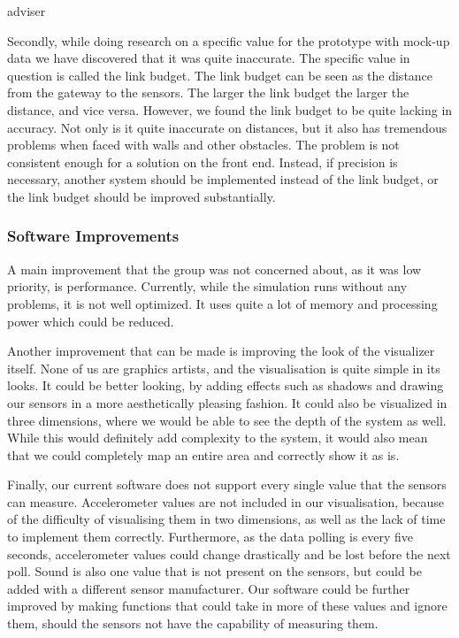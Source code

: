 adviser\documentclass[../document]{subfiles}
\begin{document}
Secondly, while doing research on a specific value for the prototype with mock-up data we have discovered that it was quite inaccurate. The specific value in question is called the link budget. The link budget can be seen as the distance from the gateway to the sensors. The larger the link budget the larger the distance, and vice versa. However, we found the link budget to be quite lacking in accuracy. Not only is it quite inaccurate on distances, but it also has tremendous problems when faced with walls and other obstacles. The problem is not consistent enough for a solution on the front end. Instead, if precision is necessary, another system should be implemented instead of the link budget, or the link budget should be improved substantially. 

\subsubsection{Software Improvements}
A main improvement that the group was not concerned about, as it was low priority, is performance. Currently, while the simulation runs without any problems, it is not well optimized. It uses quite a lot of memory and processing power which could be reduced.

Another improvement that can be made is improving the look of the visualizer itself. None of us are graphics artists, and the visualisation is quite simple in its looks. It could be better looking, by adding effects such as shadows and drawing our sensors in a more aesthetically pleasing fashion. It could also be visualized in three dimensions, where we would be able to see the depth of the system as well. While this would definitely add complexity to the system, it would also mean that we could completely map an entire area and correctly show it as is.

Finally, our current software does not support every single value that the sensors can measure. Accelerometer values are not included in our visualisation, because of the difficulty of visualising them in two dimensions, as well as the lack of time to implement them correctly. Furthermore, as the data polling is every five seconds, accelerometer values could change drastically and be lost before the next poll. Sound is also one value that is not present on the sensors, but could be added with a different sensor manufacturer. Our software could be further improved by making functions that could take in more of these values and ignore them, should the sensors not have the capability of measuring them.
\end{document}
